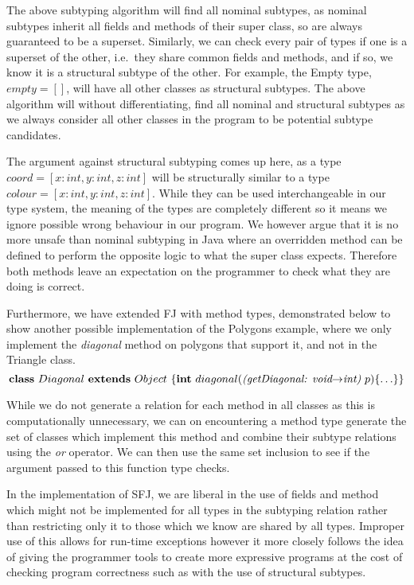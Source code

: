 \documentclass[runningheads]{llncs}
\begin{document}
The above subtyping algorithm will find all nominal subtypes, as nominal subtypes inherit all fields and methods of their super class, so are always guaranteed to be a superset. 
Similarly, we can check every pair of types if one is a superset of the other, i.e.\ they share common fields and methods, and if so, we know it is a structural subtype of the other. 
For example, the Empty type, $empty = []$, will have all other classes as structural subtypes. 
The above algorithm will without differentiating, find all nominal and structural subtypes as we always consider all other classes in the program to be potential subtype candidates.

The argument against structural subtyping comes up here, as a type $coord = [x:int, y:int, z:int]$ will be structurally similar to a type $colour = [x:int, y:int, z:int]$. 
While they can be used interchangeable in our type system, the meaning of the types are completely different so it means we ignore possible wrong behaviour in our program. 
We however argue that it is no more unsafe than nominal subtyping in Java where an overridden method can be defined to perform the opposite logic to what the super class expects. 
Therefore both methods leave an expectation on the programmer to check what they are doing is correct. 

Furthermore, we have extended FJ with method types, demonstrated below to show another possible implementation of the Polygons example, where we only implement the \textit{diagonal} method on polygons that support it, and not in the Triangle class. 
$$
\mathbf{class} \  Diagonal \ \mathbf{extends }\  Object\ \{
	\mathbf{int}\ diagonal(\textit{(getDiagonal: void$\rightarrow$int)}  \ p)\{\ldots\}
\}
$$

While we do not generate a relation for each method in all classes as this is computationally unnecessary, we can on encountering a method type generate the set of classes which implement this method and combine their subtype relations using the \textit{or} operator. 
We can then use the same set inclusion to see if the argument passed to this function type checks. 

In the implementation of SFJ, we are liberal in the use of fields and method which might not be implemented for all types in the subtyping relation rather than restricting only it to those which we know are shared by all types.
Improper use of this allows for run-time exceptions however it more closely follows the idea of giving the programmer tools to create more expressive programs at the cost of checking program correctness such as with the use of structural subtypes. 
\end{document}
